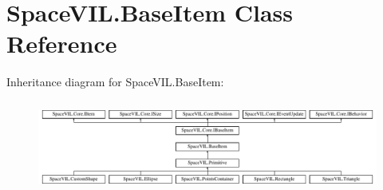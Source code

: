 \hypertarget{class_space_v_i_l_1_1_base_item}{}\section{Space\+V\+I\+L.\+Base\+Item Class Reference}
\label{class_space_v_i_l_1_1_base_item}
Inheritance diagram for Space\+V\+I\+L.\+Base\+Item\+:\begin{figure}[H]
\begin{center}
\leavevmode
\includegraphics[height=3.027027cm]{class_space_v_i_l_1_1_base_item}
\end{center}
\end{figure}
